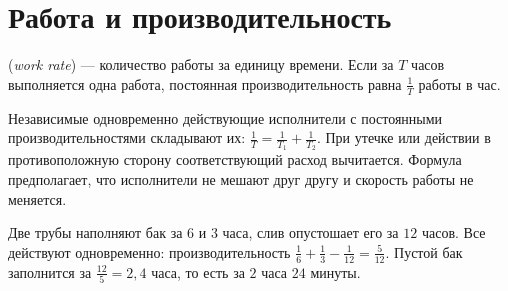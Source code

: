 \section{Работа и производительность}
\begin{definition} (\emph{work rate}) --- количество работы за единицу времени. Если за \(T\) часов выполняется одна работа, постоянная производительность равна \(\frac{1}{T}\) работы в час.\end{definition}
Независимые одновременно действующие исполнители с постоянными производительностями складывают их: \(\frac1T=\frac1{T_1}+\frac1{T_2}\). При утечке или действии в противоположную сторону соответствующий расход вычитается. Формула предполагает, что исполнители не мешают друг другу и скорость работы не меняется.
\begin{example}Две трубы наполняют бак за \(6\) и \(3\) часа, слив опустошает его за \(12\) часов. Все действуют одновременно: производительность \(\frac16+\frac13-\frac1{12}=\frac5{12}\). Пустой бак заполнится за \(\frac{12}{5}=2{,}4\) часа, то есть за \(2\) часа \(24\) минуты.\end{example}
